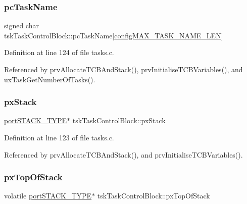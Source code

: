 \subsubsection{\texorpdfstring{pc\+Task\+Name}{pcTaskName}}
{\footnotesize\ttfamily signed char tsk\+Task\+Control\+Block\+::pc\+Task\+Name\mbox{[}\hyperlink{FreeRTOSConfig_8h_ac388dc4041aab6997348828eb27fc1a8}{config\+M\+A\+X\+\_\+\+T\+A\+S\+K\+\_\+\+N\+A\+M\+E\+\_\+\+L\+EN}\mbox{]}}



Definition at line 124 of file tasks.\+c.



Referenced by prv\+Allocate\+T\+C\+B\+And\+Stack(), prv\+Initialise\+T\+C\+B\+Variables(), and ux\+Task\+Get\+Number\+Of\+Tasks().

\mbox{\label{structtskTaskControlBlock_a4586e39b121c224e22e0e84b04b8e3f3}} 
\subsubsection{\texorpdfstring{px\+Stack}{pxStack}}
{\footnotesize\ttfamily \hyperlink{portmacro_8h_ab0a294066ac7369b8f59a52d9491a92c}{port\+S\+T\+A\+C\+K\+\_\+\+T\+Y\+PE}$\ast$ tsk\+Task\+Control\+Block\+::px\+Stack}



Definition at line 123 of file tasks.\+c.



Referenced by prv\+Allocate\+T\+C\+B\+And\+Stack(), and prv\+Initialise\+T\+C\+B\+Variables().

\mbox{\label{structtskTaskControlBlock_afc326fefc205c0643b866b46422dad48}} 
\subsubsection{\texorpdfstring{px\+Top\+Of\+Stack}{pxTopOfStack}}
{\footnotesize\ttfamily volatile \hyperlink{portmacro_8h_ab0a294066ac7369b8f59a52d9491a92c}{port\+S\+T\+A\+C\+K\+\_\+\+T\+Y\+PE}$\ast$ tsk\+Task\+Control\+Block\+::px\+Top\+Of\+Stack}



